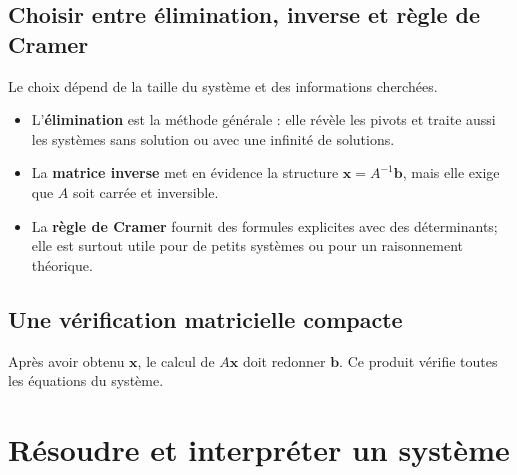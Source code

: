 \subsection{Choisir entre élimination, inverse et règle de Cramer}
Le choix dépend de la taille du système et des informations cherchées.
\begin{itemize}
\item L'\textbf{élimination} est la méthode générale : elle révèle les pivots et traite aussi les systèmes sans solution ou avec une infinité de solutions.
\item La \textbf{matrice inverse} met en évidence la structure $\mathbf x=A^{-1}\mathbf b$, mais elle exige que $A$ soit carrée et inversible.
\item La \textbf{règle de Cramer} fournit des formules explicites avec des déterminants; elle est surtout utile pour de petits systèmes ou pour un raisonnement théorique.
\end{itemize}

\begin{center}
\end{center}

\subsection{Une vérification matricielle compacte}
Après avoir obtenu $\mathbf x$, le calcul de $A\mathbf x$ doit redonner $\mathbf b$. Ce produit vérifie toutes les équations du système.


\section{Résoudre et interpréter un système}
\label{manual:section:12.09}

